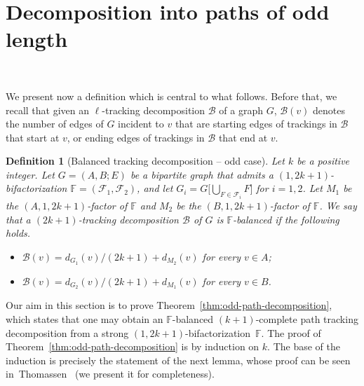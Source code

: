 \documentclass[12pt,reqno,a4paper]{amsart}
\newtheorem{definition}[theorem]{Definition}
\newcommand{\D}{\mathcal{D}}
\newcommand{\B}{\mathcal{B}}
\begin{document}


	
\section{Decomposition into paths of odd length}~\label{section:odd-paths}

We present now a definition which is central to what follows.
Before that, we recall that given %
an \(\ell\)-tracking decomposition \(\B\) of a graph $G$, 
$\B(v)$ denotes the number of edges of \(G\) incident to \(v\) that are 
starting edges of trackings in \(\B\) 
that start at \(v\), or ending edges of trackings in $\B$ that end at $v$.


\begin{definition}[Balanced tracking decomposition -- odd case]
Let \(k\) be a positive integer.
Let \(G = (A,B;E)\) be a bipartite graph 
that admits a \((1,2k+1)\)-bifactorization 
\(\mathbb{F}=(\mathcal{F}_1,\mathcal{F}_2)\),
and let \(G_i = G\big[\bigcup_{F\in\mathcal{F}_i}F\big]\) for \(i=1,2\).
Let \(M_1\) be the \((A,1,2k+1)\)-factor of \(\mathbb{F}\) and \(M_2\) be the
\((B,1,2k+1)\)-factor of \(\mathbb{F}\).
%
We say that %
a \((2k+1)\)-tracking decomposition \(\B\) of \(G\) is \emph{\(\mathbb{F}\)-balanced}
if the following holds.
	\begin{itemize}
		\item \(\B(v) = d_{G_1}(v)/(2k+1) + d_{M_2}(v)\) for every \(v\in A\);
		\item \(\B(v) = d_{G_2}(v)/(2k+1) + d_{M_1}(v)\) for every \(v\in B\).
	\end{itemize}
\end{definition}

Our aim in this section is to prove
Theorem~\ref{thm:odd-path-decomposition}, which states that one may obtain an
$\mathbb{F}$-balanced \((k+1)\)-complete
path tracking decomposition from a strong
$(1,2k+1)$-bifactorization~$\mathbb{F}$. The proof of
Theorem~\ref{thm:odd-path-decomposition} is by induction on $k$. The
base of the induction is precisely the statement of the next lemma, whose proof can be seen
in~Thomassen~\cite{Th08b} (we present it for completeness). 
\end{document}
